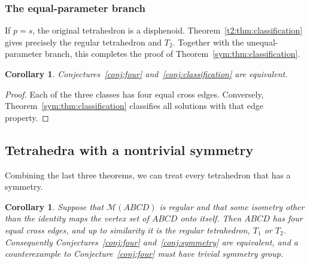 \documentclass[11pt]{article}
\newtheorem{corollary}[theorem]{Corollary}
\theoremstyle{definition}
\theoremstyle{remark}
\newcommand{\M}{\mathcal M}
\begin{document}
\subsubsection*{The equal-parameter branch}
If $p=s$, the original tetrahedron is a disphenoid. Theorem~\ref{t2:thm:classification} gives precisely the regular tetrahedron and $T_2$. Together with the unequal-parameter branch, this completes the proof of Theorem~\ref{sym:thm:classification}.

\begin{corollary}\label{sym:cor:equivalence}
Conjectures~\ref{conj:four} and~\ref{conj:classification} are equivalent.
\end{corollary}
\begin{proof}
Each of the three classes has four equal cross edges. Conversely, Theorem~\ref{sym:thm:classification} classifies all solutions with that edge property.
\end{proof}


\subsection{Tetrahedra with a nontrivial symmetry}

Combining the last three theorems, we can treat every tetrahedron that has a symmetry.

\begin{corollary}\label{cor:symmetric}
Suppose that $\M(ABCD)$ is regular and that some isometry other than the identity maps the vertex set of $ABCD$ onto itself. Then $ABCD$ has four equal cross edges, and up to similarity it is the regular tetrahedron, $T_1$ or $T_2$. Consequently Conjectures~\ref{conj:four} and~\ref{conj:symmetry} are equivalent, and a counterexample to Conjecture~\ref{conj:four} must have trivial symmetry group.
\end{corollary}
\end{document}
